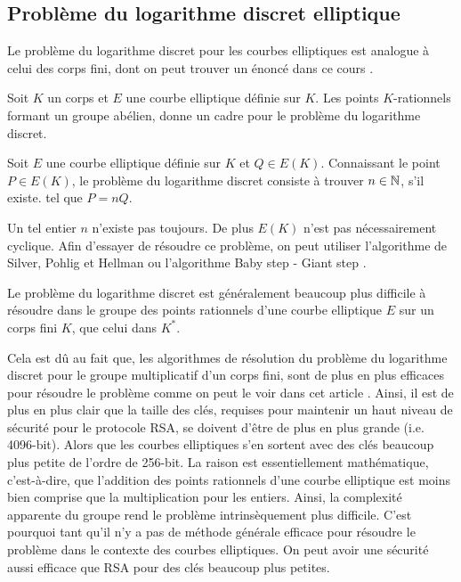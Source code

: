 \subsection{Problème du logarithme discret elliptique}

Le problème du logarithme discret pour les courbes elliptiques est analogue à celui
des corps fini, dont on peut trouver un énoncé dans ce cours \cite[p18]{KrausCf}.

Soit $K$ un corps et $E$ une courbe elliptique définie sur $K$. Les points $K$-rationnels
formant un groupe abélien, donne un cadre pour le problème du logarithme discret.

\begin{definition}
    Soit $E$ une courbe elliptique définie sur $K$ et $Q \in E(K)$. Connaissant le point $P
    \in E(K)$, le problème du logarithme discret consiste à trouver $n \in \mathbb{N}$, s'il existe.
    tel que $P = nQ$.
\end{definition}

Un tel entier $n$ n'existe pas toujours. De plus $E(K)$ n'est pas nécessairement cyclique. Afin
d'essayer de résoudre ce problème, on peut utiliser l'algorithme de Silver, Pohlig et
Hellman \cite[p20]{KrausCF} ou l'algorithme Baby step - Giant step \cite[p38]{KrausCE}.

\begin{remarque}
    Le problème du logarithme discret est généralement beaucoup plus difficile à
    résoudre dans le groupe des points rationnels d'une courbe elliptique $E$ sur un
    corps fini $K$, que celui dans $K^*$. 
\end{remarque}

Cela est dû au fait que, les algorithmes de résolution du problème du logarithme discret
pour le groupe multiplicatif d'un corps fini, sont de plus en plus efficaces pour résoudre le
problème comme on peut le voir dans cet article \cite{Lipton2013}. Ainsi, il est
de plus en plus clair que la taille des clés, requises pour maintenir un haut niveau de
sécurité pour le protocole RSA, se doivent d'être de plus en plus grande (i.e. 4096-bit).
Alors que les courbes elliptiques s'en sortent avec des clés beaucoup plus petite de l'ordre
de 256-bit. La raison est essentiellement mathématique, c'est-à-dire, que l'addition des points
rationnels d'une courbe elliptique est moins bien comprise que la multiplication pour les
entiers. Ainsi, la complexité apparente du groupe rend le problème intrinsèquement plus
difficile. C'est pourquoi tant qu'il n'y a pas de méthode générale efficace pour résoudre
le problème dans le contexte des courbes elliptiques. On peut avoir une sécurité aussi efficace
que RSA pour des clés beaucoup plus petites. 

